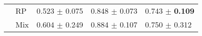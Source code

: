 \begin{tabular}{lllll}
 & RP & \textcolor[rgb]{0.9027777778,0.0972222222,0}{0.523} $\pm$ \textcolor[rgb]{0.2527202683,0.5000000000,0}{0.075} & \textcolor[rgb]{0.4005979073,0.5000000000,0}{0.848} $\pm$ \textcolor[rgb]{0.0540306485,0.5000000000,0}{0.073} & \textcolor[rgb]{0.5132743363,0.4867256637,0}{0.743} $\pm$ \textbf{\textcolor[rgb]{0.0000000000,0.5000000000,0}{0.109}} \\
 & Mix & \textcolor[rgb]{0.7161458333,0.2838541667,0}{0.604} $\pm$ \textcolor[rgb]{0.8349973530,0.1650026470,0}{0.249} & \textcolor[rgb]{0.2680617838,0.5000000000,0}{0.884} $\pm$ \textcolor[rgb]{0.2488331266,0.5000000000,0}{0.107} & \textcolor[rgb]{0.4955752212,0.5000000000,0}{0.750} $\pm$ \textcolor[rgb]{0.6255914256,0.3744085744,0}{0.312} \\
\bottomrule
\end{tabular}

